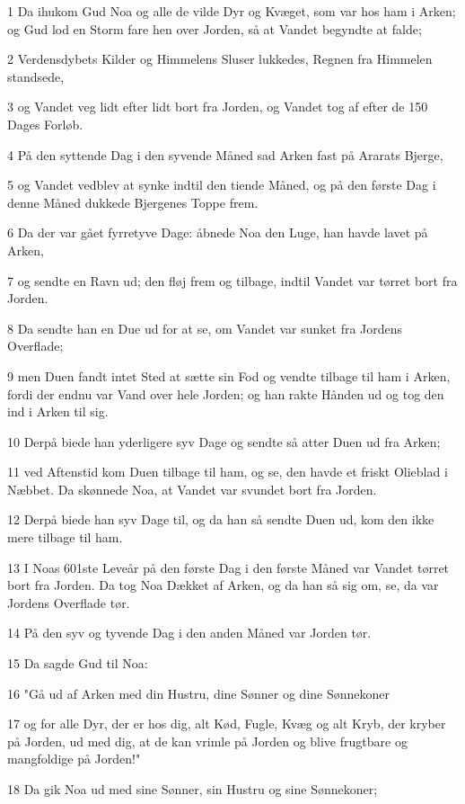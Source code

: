 \par 1 Da ihukom Gud Noa og alle de vilde Dyr og Kvæget, som var hos ham i Arken; og Gud lod en Storm fare hen over Jorden, så at Vandet begyndte at falde;
\par 2 Verdensdybets Kilder og Himmelens Sluser lukkedes, Regnen fra Himmelen standsede,
\par 3 og Vandet veg lidt efter lidt bort fra Jorden, og Vandet tog af efter de 150 Dages Forløb.
\par 4 På den syttende Dag i den syvende Måned sad Arken fast på Ararats Bjerge,
\par 5 og Vandet vedblev at synke indtil den tiende Måned, og på den første Dag i denne Måned dukkede Bjergenes Toppe frem.
\par 6 Da der var gået fyrretyve Dage: åbnede Noa den Luge, han havde lavet på Arken,
\par 7 og sendte en Ravn ud; den fløj frem og tilbage, indtil Vandet var tørret bort fra Jorden.
\par 8 Da sendte han en Due ud for at se, om Vandet var sunket fra Jordens Overflade;
\par 9 men Duen fandt intet Sted at sætte sin Fod og vendte tilbage til ham i Arken, fordi der endnu var Vand over hele Jorden; og han rakte Hånden ud og tog den ind i Arken til sig.
\par 10 Derpå biede han yderligere syv Dage og sendte så atter Duen ud fra Arken;
\par 11 ved Aftenstid kom Duen tilbage til ham, og se, den havde et friskt Olieblad i Næbbet. Da skønnede Noa, at Vandet var svundet bort fra Jorden.
\par 12 Derpå biede han syv Dage til, og da han så sendte Duen ud, kom den ikke mere tilbage til ham.
\par 13 I Noas 601ste Leveår på den første Dag i den første Måned var Vandet tørret bort fra Jorden. Da tog Noa Dækket af Arken, og da han så sig om, se, da var Jordens Overflade tør.
\par 14 På den syv og tyvende Dag i den anden Måned var Jorden tør.
\par 15 Da sagde Gud til Noa:
\par 16 "Gå ud af Arken med din Hustru, dine Sønner og dine Sønnekoner
\par 17 og for alle Dyr, der er hos dig, alt Kød, Fugle, Kvæg og alt Kryb, der kryber på Jorden, ud med dig, at de kan vrimle på Jorden og blive frugtbare og mangfoldige på Jorden!"
\par 18 Da gik Noa ud med sine Sønner, sin Hustru og sine Sønnekoner;
